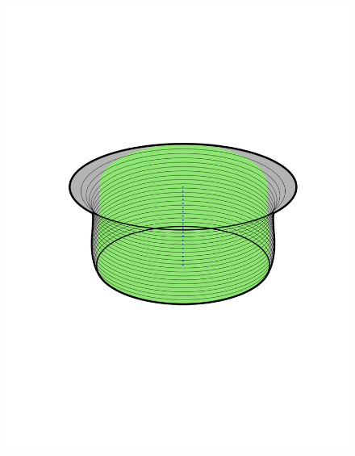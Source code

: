 \begin{figure}[!t]
\begin{minipage}[c]{0.3\columnwidth}
    \includegraphics[width=1\columnwidth, trim={0cm 6cm 0cm
      6cm}]{figures/method/FunnelSimnew1}
  \end{minipage}
  \begin{minipage}[l]{0.3\columnwidth}

\end{minipage}
\end{figure}
